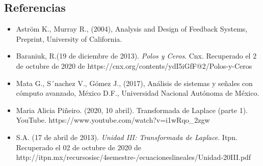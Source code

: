 \documentclass[10pt]{article}
\begin{document}
	
	
	
	
	
	
	
	
	
	\subsection*{Referencias}
	
	\begin{itemize}
		\item Aström K., Murray R., (2004), Analysis and Design of Feedback Systems, Preprint, University of California.
		\item Baraniuk, R.(19 de diciembre de 2013).\textit{ Polos y Ceros}. Cnx. Recuperado el 2 de octubre de 2020 de
		\subitem https://cnx.org/contents/ydI5iGfF@2/Polos-y-Ceros	
		\item Mata G., S´nachez V., Gómez J., (2017), Análisis de sistemas y señales con cómputo avanzado, México D.F., Universidad Nacional Autónoma de México.
		\item Maria Alicia Piñeiro. (2020, 10 abril). Transformada de Laplace (parte 1). YouTube. 
		\subitem https://www.youtube.com/watch?v=i1wRqo\_2zgw
		
		\item	S.A. (17 de abril de 2013).\textit{ Unidad III: Transformada de Laplace}. Itpn. Recuperado el 02 de octubre de 2020 de http://itpn.mx/recursosisc/4semestre-/ecuacioneslineales/Unidad-20III.pdf
	\end{itemize}
	
	
\end{document}
